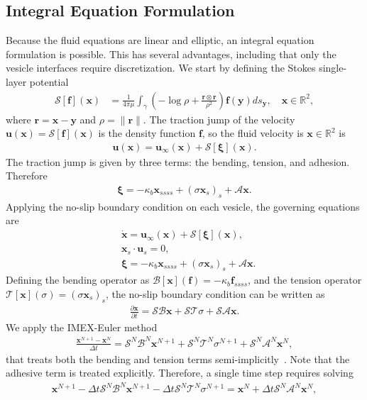 \documentclass[prf,superscriptaddress,showpacs]{revtex4-1}
\renewcommand{\AA}{\mathcal{A}}
\newcommand{\BB}{\mathcal{B}}
\newcommand{\ff}{\mathbf{f}}
\newcommand{\pderiv}[2]{\frac{\partial #1}{\partial #2}}
\newcommand{\rr}{\mathbf{r}}
\newcommand{\RR}{\mathbb{R}}
\renewcommand{\SS}{\mathcal{S}}
\newcommand{\TT}{\mathcal{T}}
\newcommand{\uu}{\mathbf{u}}
\newcommand{\xx}{\mathbf{x}}
\newcommand{\xxi}{\boldsymbol{\xi}}
\newcommand{\yy}{\mathbf{y}}
\begin{document}
\subsection{Integral Equation Formulation}
Because the fluid equations are linear and elliptic, an integral
equation formulation is possible.  This has several advantages,
including that only the vesicle interfaces require discretization.  We
start by defining the Stokes single-layer potential
\begin{align}
  \SS[\ff](\xx) &= \frac{1}{4\pi\mu} \int_\gamma \left(
    -\log \rho + \frac{\rr \otimes \rr}{\rho^2} \right) 
    \ff(\yy) ds_\yy, \quad \xx \in \RR^2,
  \label{eqn:SLP}
\end{align}
where $\rr = \xx - \yy$ and $\rho = \|\rr\|$.  The traction jump of the
velocity $\uu(\xx) = \SS[\ff](\xx)$ is the density function $\ff$, so
the fluid velocity is $\xx \in \RR^2$ is
\begin{align*}
  \uu(\xx) = \uu_{\infty}(\xx) + \SS[\xxi](\xx).
\end{align*}
The traction jump is given by three terms: the bending, tension, and
adhesion.  Therefore
\begin{align*}
  \xxi = -\kappa_b \xx_{ssss} + (\sigma \xx_s)_s + \AA \xx.
\end{align*}
Applying the no-slip boundary condition on each vesicle, the governing
equations are
\begin{align*}
  &\dot{\xx} = \uu_{\infty}(\xx) + \SS[\xxi](\xx), \\
  &\xx_s \cdot \uu_s = 0, \\
  &\xxi = -\kappa_b \xx_{ssss} + (\sigma \xx_s)_s + \AA\xx.
\end{align*}
Defining the bending operator as $\BB[\xx](\ff) = -\kappa_b \ff_{ssss}$,
and the tension operator $\TT[\xx](\sigma) = (\sigma \xx_s)_s$, the
no-slip boundary condition can be written as
\begin{align*}
  \pderiv{\xx}{t} = \SS \BB \xx + \SS \TT \sigma + \SS \AA \xx.
\end{align*}
We apply the IMEX-Euler method 
\begin{align*}
  \frac{\xx^{N+1} - \xx^N}{\Delta t} = \SS^N \BB^N \xx^{N+1} + 
  \SS^N \TT^N \sigma^{N+1} + \SS^N \AA^N \xx^N,
\end{align*}
that treats both the bending and tension terms
semi-implicitly~\cite{quaife2016adaptive}. Note that the adhesive term is
treated explicitly.  Therefore, a single time step requires solving
\begin{align}
  \xx^{N+1} - \Delta t \SS^N \BB^N \xx^{N+1} - 
    \Delta t \SS^N \TT^N \sigma^{N+1} = \xx^N + 
    \Delta t \SS^N \AA^N \xx^N,
  \label{eqn:IMEXEuler}
\end{align}
\end{document}
